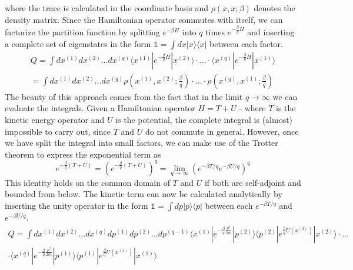 where the trace is calculated in the coordinate basis and $\rho(x, x; \beta)$ denotes the density matrix. Since the Hamiltonian operator commutes with itself, we can factorize the partition function by splitting $e^{-\beta H}$ into $q$ times $e^{-\frac{\beta}{q} H}$ and inserting a complete set of eigenstates in the form $\mathbb{1} = \int dx  | x \rangle \langle x | $ between each factor.
\begin{equation}
\begin{split}
Q = \int dx^{(1)}dx^{(2)}\ldots dx^{(q)} \langle x^{(1)} | e^{-\frac{\beta}{q} H}| x^{(2)}\rangle\cdot \ldots\cdot \langle x^{(q)} | e^{-\frac{\beta}{q} H}| x^{(1)}\rangle \\
= \int dx^{(1)}dx^{(2)}\ldots dx^{(q)} \rho(x^{(1)}, x^{(2)}; \frac{\beta}{q})\cdot \ldots \cdot \rho(x^{(q)}, x^{(1)}; \frac{\beta}{q})
\end{split}
\end{equation}  
The beauty of this approach comes from the fact that in the limit $q \rightarrow \infty$ we can evaluate the integrals. Given a Hamiltonian operator $H = T + U$ - where  $T$ is the kinetic energy operator and $U$ is the potential, the complete integral is (almost) impossible to carry out, since $T$ and $U$ do not commute in general. However, once we have split the integral into small factors, we can make use of the Trotter theorem to express the exponential term as 
\begin{equation}
e^{-\frac{\beta}{q}\left(T + U\right)} = \left(e^{-\frac{\beta}{q}\left(T + U\right)}\right)^q = \lim_{q \rightarrow \infty}\left(e^{-\beta T/q}e^{-\beta U/q}\right)^q 
\end{equation}
This identity holds on the common domain of $T$ and $U$ if both are self-adjoint and bounded from below.  The kinetic term can now be calculated analytically by inserting the unity operator in the form $\mathbb{1} = \int dp  | p \rangle \langle p | $ between each $e^{-\beta T/q}$ and $e^{-\beta U/q}$.
\begin{equation}
\begin{split}
Q = \int dx^{(1)}dx^{(2)} \ldots dx^{(q)}dp^{(1)}dp^{(2)}\ldots dp^{(q-1)} \langle x^{(1)} | e^{-\frac{\beta}{q} \frac{p^2}{2m}}| p^{(2)} \rangle \langle p^{(2)} | e^{\frac{\beta}{q}U(x^{(2)})}| x^{(2)}\rangle\cdot \ldots \\
\cdot \langle x^{(q)} | e^{-\frac{\beta}{q} \frac{p^2}{2m}}| p^{(1)} \rangle \langle p^{(1)} | e^{\frac{\beta}{q}U(x^{(1)})} | x^{(1)}\rangle
\end{split}
\end{equation}
